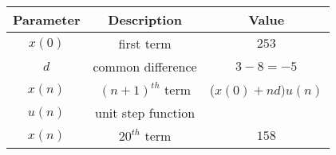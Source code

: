 \begin{tabular}{|c|c|c|}
        \hline
        \textbf{Parameter} & \textbf{Description}&\textbf{Value}\\
        \hline
        $x(0)$ & first term  & $253$ \\
         \hline
        $d$ & common difference & $3 - 8 = -5$\\
        \hline
        $x(n)$ & $(n+1)^{th}$ term &($x(0) + nd)u(n)$ \\
        \hline
        $u(n)$  & unit step function  &\\
        \hline
        $x(n)$ & $20^{th}$ term&$158$\\
        \hline
    \end{tabular}
